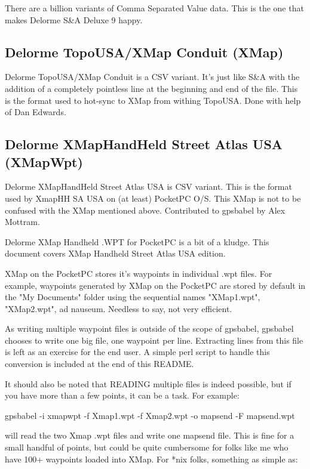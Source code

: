 \documentclass[12pt]{article}
\begin{document}
	There are a billion variants of Comma Separated Value data.  This
	is the one that makes Delorme S\&A Deluxe 9 happy.



\subsection{Delorme TopoUSA/XMap Conduit (XMap)}

	Delorme TopoUSA/XMap Conduit is a CSV variant.  It's just like S\&A with the addition of a 
	completely pointless line at the beginning and end of the file.   
	This is the format used to hot-sync to XMap from withing TopoUSA.
	Done with help of Dan Edwards.



\subsection{Delorme XMapHandHeld Street Atlas USA (XMapWpt)}

	Delorme XMapHandHeld Street Atlas USA is CSV variant.  This is the format used by XmapHH SA USA on
	(at least) PocketPC O/S.  This XMap is not to be confused
	with the XMap mentioned above. Contributed to gpsbabel by
	Alex Mottram.

Delorme XMap Handheld .WPT for PocketPC is a bit of a kludge.  This 
document covers XMap Handheld Street Atlas USA edition.

XMap on the PocketPC stores it's waypoints in individual .wpt files.
For example, waypoints generated by XMap on the PocketPC are stored
by default in the "My Documents" folder using the sequential names
"XMap1.wpt", "XMap2.wpt", ad nauseum.  Needless to say, not very
efficient.

As writing multiple waypoint files is outside of the scope of gpsbabel,
gpsbabel chooses to write one big file, one waypoint per line.  
Extracting lines from this file is left as an exercise for the end user.  
A simple perl script to handle this conversion is included at the end 
of this README.

It should also be noted that READING multiple files is indeed possible,
but if you have more than a few points, it can be a task.  For example:

gpsbabel -i xmapwpt -f Xmap1.wpt -f Xmap2.wpt -o mapsend -F mapsend.wpt

will read the two Xmap .wpt files and write one mapsend file.  This
is fine for a small handful of points, but could be quite cumbersome
for folks like me who have 100+ waypoints loaded into XMap.  For *nix
folks, something as simple as:
\end{document}

